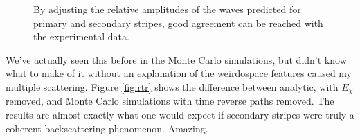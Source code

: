 \begin{figure}
\centering
{}
\caption{By adjusting the relative amplitudes of the waves predicted for
primary and secondary stripes, good agreement can be reached with the
experimental data.}
\label{fig:increaseintensity}
\end{figure}
We've actually seen this before in the Monte Carlo simulations, but didn't
know what to make of it without an explanation of the weirdospace features
caused my multiple scattering.  Figure \ref{fig:rtr} shows the difference
between analytic, with $E_\chi$ removed, and Monte Carlo simulations with
time reverse paths removed.  The results are almost exactly what one would
expect if secondary stripes were truly a coherent backscattering
phenomenon.  Amazing.
